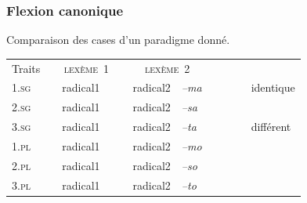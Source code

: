 \begin{frame}
\frametitle{Flexion canonique}
Comparaison des cases d'un paradigme donné.

\scriptsize

\begin{table}
\begin{tabular}{|l| p{1mm}|ll|p{1mm}|ll|p{1mm}cl}
\cline{1-1}\cline{3-4}\cline{6-7}
Traits&&\multicolumn{2}{|c|}{\cellcolor{white}\textsc{ lexème~1}}&&\multicolumn{2}{|c|}{\textsc{ lexème~2}}&&\\
\cline{1-1}\cline{3-4}\cline{6-7}
\textsc{1.sg}&& \cellcolor{ciel}radical1& \cellcolor{mandarine}{\em --ma}&&radical2& {\em
  --ma}&&\cellcolor{ciel}~~~&identique\\
\cline{1-1}\cline{3-4}\cline{6-7}
\textsc{2.sg}& &\cellcolor{ciel}radical1&\cellcolor{mandarine}{\em --sa}&&radical2& {\em --sa}&&&\\
\cline{1-1}\cline{3-4}\cline{6-7}

\textsc{3.sg}&& \cellcolor{ciel}radical1&\cellcolor{mandarine}{\em --ta}&&radical2& {\em
  --ta}&&\cellcolor{mandarine}&différent\\
\cline{1-1}\cline{3-4}\cline{6-7}
\textsc{1.pl}&&\cellcolor{ciel}radical1& \cellcolor{mandarine}{\em --mo}&&radical2& {\em --mo}&&\\
\cline{1-1}\cline{3-4}\cline{6-7}
\textsc{2.pl}&&\cellcolor{ciel}radical1& \cellcolor{mandarine}{\em --so}&&radical2& {\em --so}&&\\
\cline{1-1}\cline{3-4}\cline{6-7}
\textsc{3.pl}&&\cellcolor{ciel}radical1& \cellcolor{mandarine}{\em --to}&&radical2& {\em --to}&&\\
\cline{1-1}\cline{3-4}\cline{6-7}
\end{tabular}\\[1mm]
\end{table}
\end{frame}


